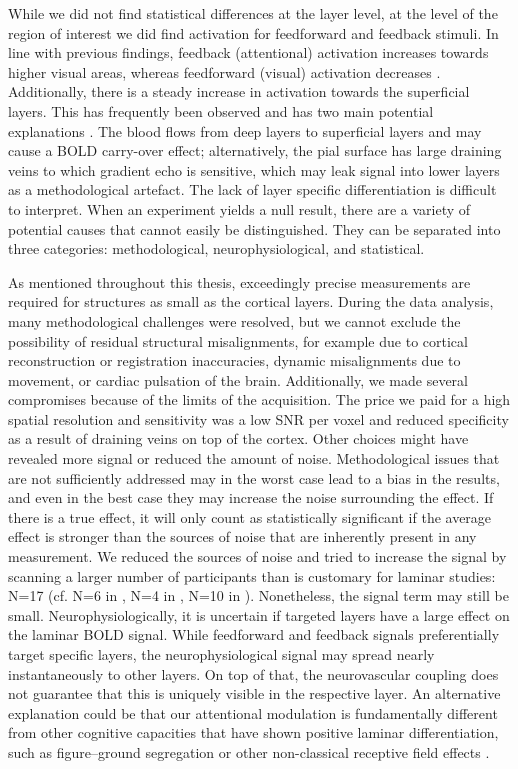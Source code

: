 While we did not find statistical differences at the layer level, at the level of the region of interest we did find activation for feedforward and feedback stimuli. In line with previous findings, feedback (attentional) activation increases towards higher visual areas, whereas feedforward (visual) activation decreases \cite{Murray2008,Jehee2011}. Additionally, there is a steady increase in activation towards the superficial layers. This has frequently been observed and has two main potential explanations \cite{Koopmans2010,Polimeni2010}. The blood flows from deep layers to superficial layers and may cause a BOLD carry-over effect; alternatively, the pial surface has large draining veins to which gradient echo is sensitive, which may leak signal into lower layers as a methodological artefact. The lack of layer specific differentiation is difficult to interpret. When an experiment yields a null result, there are a variety of potential causes that cannot easily be distinguished. They can be separated into three categories: methodological, neurophysiological, and statistical.

As mentioned throughout this thesis, exceedingly precise measurements are required for structures as small as the cortical layers. During the data analysis, many methodological challenges were resolved, but we cannot exclude the possibility of residual structural misalignments, for example due to cortical reconstruction or registration inaccuracies, dynamic misalignments due to movement, or cardiac pulsation of the brain. Additionally, we made several compromises because of the limits of the acquisition. The price we paid for a high spatial resolution and sensitivity was a low SNR per voxel and reduced specificity as a result of draining veins on top of the cortex. Other choices might have revealed more signal or reduced the amount of noise. Methodological issues that are not sufficiently addressed may in the worst case lead to a bias in the results, and even in the best case they may increase the noise surrounding the effect. If there is a true effect, it will only count as statistically significant if the average effect is stronger than the sources of noise that are inherently present in any measurement. We reduced the sources of noise and tried to increase the signal by scanning a larger number of participants than is customary for laminar studies: N=17 (cf. N=6 in \cite{Polimeni2010}, N=4 in \cite{Muckli2015}, N=10 in \cite{Kok2016}). Nonetheless, the signal term may still be small. Neurophysiologically, it is uncertain if targeted layers have a large effect on the laminar BOLD signal. While feedforward and feedback signals preferentially target specific layers, the neurophysiological signal may spread nearly instantaneously to other layers. On top of that, the neurovascular coupling does not guarantee that this is uniquely visible in the respective layer. An alternative explanation could be that our attentional modulation is fundamentally different from other cognitive capacities that have shown positive laminar differentiation, such as figure–ground segregation \cite{Kok2015} or other non-classical receptive field effects \cite{Muckli2015}.

